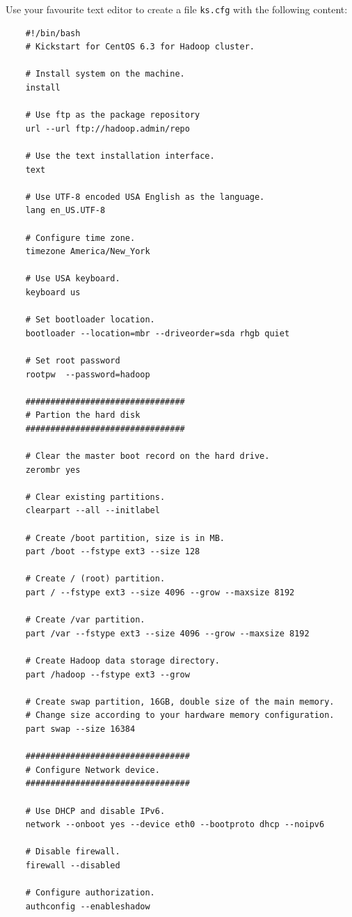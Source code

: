 Use your favourite text editor to create a file \verb|ks.cfg| with the following content:
\begin{verbatim}
    #!/bin/bash
    # Kickstart for CentOS 6.3 for Hadoop cluster.

    # Install system on the machine.
    install

    # Use ftp as the package repository
    url --url ftp://hadoop.admin/repo

    # Use the text installation interface.
    text

    # Use UTF-8 encoded USA English as the language.
    lang en_US.UTF-8

    # Configure time zone.
    timezone America/New_York

    # Use USA keyboard.
    keyboard us

    # Set bootloader location.
    bootloader --location=mbr --driveorder=sda rhgb quiet

    # Set root password
    rootpw  --password=hadoop

    ################################
    # Partion the hard disk
    ################################

    # Clear the master boot record on the hard drive.
    zerombr yes

    # Clear existing partitions.
    clearpart --all --initlabel

    # Create /boot partition, size is in MB.
    part /boot --fstype ext3 --size 128

    # Create / (root) partition.
    part / --fstype ext3 --size 4096 --grow --maxsize 8192

    # Create /var partition.
    part /var --fstype ext3 --size 4096 --grow --maxsize 8192

    # Create Hadoop data storage directory.
    part /hadoop --fstype ext3 --grow

    # Create swap partition, 16GB, double size of the main memory.
    # Change size according to your hardware memory configuration.
    part swap --size 16384

    #################################
    # Configure Network device.
    #################################

    # Use DHCP and disable IPv6.
    network --onboot yes --device eth0 --bootproto dhcp --noipv6

    # Disable firewall.
    firewall --disabled

    # Configure authorization.
    authconfig --enableshadow


\end{verbatim}
